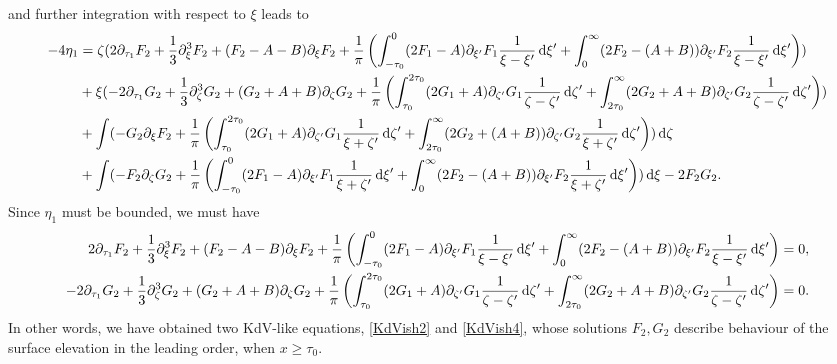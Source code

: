 \documentclass[10pt,reqno,oneside,a4paper, landscape]{article}
\begin{document}
and further integration with respect to $\xi$ leads to
\begin{align*}
- 4\eta_{1} &= \zeta (2 \partial_{\tau_1}F_2 + \frac{1}{3} \partial_\xi^3 F_2 + (F_2-A-B)\partial_\xi F_2 + \frac{1}{\pi} \left( \int^0_{-\tau_0} (2 F_1 -A)\partial_{\xi'}F_1\frac{1}{\xi -\xi'} \,\mathrm{d} \xi' + \int^{\infty}_{0} (2 F_2 -  (A+B))\partial_{\xi'} F_2 \frac{1}{\xi -\xi'} \,\mathrm{d} \xi'  \right)) \\
&+\xi (- 2 \partial_{\tau_1} G_2 +  \frac{1}{3} \partial_\zeta^3 G_2+ (G_2+ A +B) \partial_{\zeta} G_2  + \frac{1}{\pi}  \left( \int^{2\tau_0}_{\tau_0} (2 G_1 +A)\partial_{\zeta'} G_1 \frac{1}{\zeta -\zeta'} \,\mathrm{d} \zeta' + \int^{\infty}_{2\tau_0} (2 G_2+A+B) \partial_{\zeta'} G_2 \frac{1}{\zeta -\zeta'} \,\mathrm{d} \zeta' \right) )\\
&+ \int (-G_2 \partial_\xi F_2 + \frac{1}{\pi}\left( \int^{2\tau_0}_{\tau_0} (2 G_1+A) \partial_{\zeta'} G_1 \frac{1}{\xi + \zeta'} \,\mathrm{d} \zeta' + \int^{\infty}_{2\tau_0} (2 G_2 + (A+B) )\partial_{\zeta'} G_2 \frac{1}{\xi + \zeta'} \,\mathrm{d} \zeta'    \right) )\,\mathrm{d} \zeta \\
&+\int (-F_2\partial_\zeta G_2 + \frac{1}{\pi} \left(\int^0_{-\tau_0} (2 F_1 - A)\partial_{\xi'} F_1 \frac{1}{\xi + \zeta'} \,\mathrm{d} \xi' + \int^{\infty}_{0} (2 F_2 -(A+B))\partial_{\xi'} F_2 \frac{1}{\xi + \zeta'} \,\mathrm{d} \xi' \right) )\,\mathrm{d} \xi - 2 F_2 G_2. 
\end{align*}
Since $\eta_1$ must be bounded, we must have 
\begin{align}
2 \partial_{\tau_1}F_2 + \frac{1}{3} \partial_\xi^3 F_2 + (F_2-A-B)\partial_\xi F_2 + \frac{1}{\pi}  \left( \int^0_{-\tau_0} (2 F_1 -A)\partial_{\xi'}F_1\frac{1}{\xi -\xi'} \,\mathrm{d} \xi' + \int^{\infty}_{0} (2 F_2 -  (A+B))\partial_{\xi'} F_2 \frac{1}{\xi -\xi'} \,\mathrm{d} \xi'  \right) &= 0 \label{KdVish2}, \\
- 2 \partial_{\tau_1} G_2 +  \frac{1}{3} \partial_\zeta^3 G_2+ (G_2+ A +B)\partial_{\zeta} G_2  + \frac{1}{\pi}  \left( \int^{2\tau_0}_{\tau_0} (2 G_1 +A)\partial_{\zeta'} G_1 \frac{1}{\zeta -\zeta'} \,\mathrm{d} \zeta' + \int^{\infty}_{2\tau_0} (2 G_2+A+B) \partial_{\zeta'} G_2 \frac{1}{\zeta -\zeta'} \,\mathrm{d} \zeta' \right) &= 0. \label{KdVish4}
\end{align}
In other words, we have obtained two KdV-like equations, \eqref{KdVish2} and \eqref{KdVish4}, whose solutions $F_2, G_2$ describe behaviour of the surface elevation in the leading order, when $x\geq \tau_0.$
\end{document}
